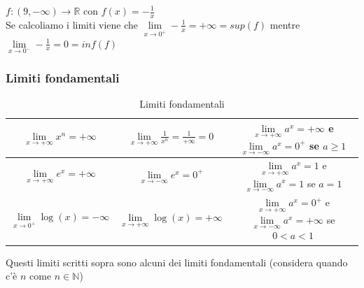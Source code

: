 \begin{example}
$f:(9, -\infty)\to \mathbb{R}$ con $f(x) = -\frac{1}{x}$\\
Se calcoliamo i limiti viene che $\lim\limits_{x\to 0^+}-\frac{1}{x} = +\infty = sup(f)$ \hspace{.1cm} mentre $\lim\limits_{x\to 0^-}-\frac{1}{x} = 0 = inf(f)$
\end{example}

\subsubsection{Limiti fondamentali}
\begin{table}[h!]
    \setlength{\tabcolsep}{7pt}
    \renewcommand{\arraystretch}{1.5}
    \centering
    \begin{tabular}{|c c|c|}
        \hline
        $\lim\limits_{x\to +\infty}x^n = +\infty$ & $\lim\limits_{x\to +\infty}\frac{1}{x^n} = \frac{1}{+\infty} = 0$ & $\lim\limits_{x\to +\infty}a^x = +\infty$ e $\lim\limits_{x\to -\infty}a^x = 0^+$ se $a \geq 1$ \\\hline
        $\lim\limits_{x\to +\infty}e^x = +\infty$ & $\lim\limits_{x\to -\infty}e^x = 0^+$ & $\lim\limits_{x\to +\infty}a^x = 1$ e $\lim\limits_{x\to -\infty}a^x = 1$ se $a = 1$  \\\hline
        $\lim\limits_{x\to 0^+}\log(x) = -\infty$ & $\lim\limits_{x\to +\infty}\log(x) = +\infty$ & $\lim\limits_{x\to +\infty}a^x = 0^+$ e $\lim\limits_{x\to -\infty}a^x = +\infty$ se $0 < a < 1$ \\
        \hline
    \end{tabular}
    \vspace{-5pt}
    \caption{Limiti fondamentali}
\end{table}
Questi limiti scritti sopra sono alcuni dei limiti fondamentali (considera quando c'è $n$ come $n\in \mathbb{N}$)

